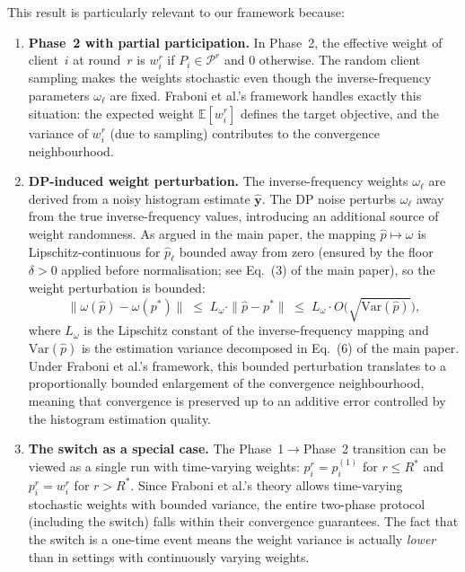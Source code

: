 \documentclass[runningheads]{llncs}
\begin{document}
This result is particularly relevant to our framework because:
\begin{enumerate}
\item \textbf{Phase~2 with partial participation.}
In Phase~2, the effective weight of client~$i$ at round~$r$ is $w_i^r$ if $P_i\in\mathcal{P}^r$ and $0$ otherwise.
The random client sampling makes the weights stochastic even though the inverse-frequency parameters $\omega_\ell$ are fixed.
Fraboni et al.'s framework handles exactly this situation: the expected weight $\mathbb{E}[w_i^r]$ defines the target objective, and the variance of $w_i^r$ (due to sampling) contributes to the convergence neighbourhood.

\item \textbf{DP-induced weight perturbation.}
The inverse-frequency weights $\omega_\ell$ are derived from a noisy histogram estimate $\hat{\mathbf{y}}$.
The DP noise perturbs $\omega_\ell$ away from the true inverse-frequency values, introducing an additional source of weight randomness.
As argued in the main paper, the mapping $\hat{p}\mapsto\omega$ is Lipschitz-continuous for $\hat{p}_\ell$ bounded away from zero (ensured by the floor $\delta>0$ applied before normalisation; see Eq.~(3) of the main paper), so the weight perturbation is bounded:
\[
\|\omega(\hat{p}) - \omega(p^*)\|
\;\le\;
L_\omega \cdot \|\hat{p}-p^*\|
\;\le\;
L_\omega \cdot O\!\bigl(\sqrt{\mathrm{Var}(\hat{p})}\bigr),
\]
where $L_\omega$ is the Lipschitz constant of the inverse-frequency mapping and $\mathrm{Var}(\hat{p})$ is the estimation variance decomposed in Eq.~(6) of the main paper.
Under Fraboni et al.'s framework, this bounded perturbation translates to a proportionally bounded enlargement of the convergence neighbourhood, meaning that convergence is preserved up to an additive error controlled by the histogram estimation quality.

\item \textbf{The switch as a special case.}
The Phase~1$\to$Phase~2 transition can be viewed as a single run with time-varying weights: $p_i^r = p_i^{(1)}$ for $r\le R^*$ and $p_i^r = w_i^r$ for $r>R^*$.
Since Fraboni et al.'s theory allows time-varying stochastic weights with bounded variance, the entire two-phase protocol (including the switch) falls within their convergence guarantees.
The fact that the switch is a one-time event means the weight variance is actually \emph{lower} than in settings with continuously varying weights.
\end{enumerate}
\end{document}

